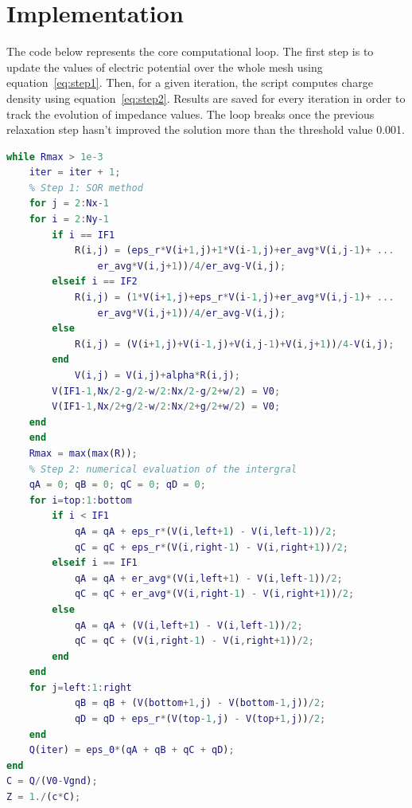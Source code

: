 \documentclass[11pt,a4paper]{article}
\begin{document}
\newpage\section{Implementation}
The code below represents the core computational loop. The first step is to update the values of electric potential over the whole mesh using equation~\ref{eq:step1}. Then, for a given iteration, the script computes charge density using equation~\ref{eq:step2}. Results are saved for every iteration in order to track the evolution of impedance values. The loop breaks once the previous relaxation step hasn't improved the solution more than the threshold value 0.001.
\begin{lstlisting}[language=Matlab]
while Rmax > 1e-3
    iter = iter + 1;
    % Step 1: SOR method
    for j = 2:Nx-1
    for i = 2:Ny-1
        if i == IF1
            R(i,j) = (eps_r*V(i+1,j)+1*V(i-1,j)+er_avg*V(i,j-1)+ ...
                er_avg*V(i,j+1))/4/er_avg-V(i,j); 
        elseif i == IF2
            R(i,j) = (1*V(i+1,j)+eps_r*V(i-1,j)+er_avg*V(i,j-1)+ ...
                er_avg*V(i,j+1))/4/er_avg-V(i,j); 
        else
            R(i,j) = (V(i+1,j)+V(i-1,j)+V(i,j-1)+V(i,j+1))/4-V(i,j);
        end
            V(i,j) = V(i,j)+alpha*R(i,j);
        V(IF1-1,Nx/2-g/2-w/2:Nx/2-g/2+w/2) = V0;
        V(IF1-1,Nx/2+g/2-w/2:Nx/2+g/2+w/2) = V0;
    end
    end
    Rmax = max(max(R));
    % Step 2: numerical evaluation of the intergral
    qA = 0; qB = 0; qC = 0; qD = 0;
    for i=top:1:bottom
        if i < IF1
            qA = qA + eps_r*(V(i,left+1) - V(i,left-1))/2;
            qC = qC + eps_r*(V(i,right-1) - V(i,right+1))/2;
        elseif i == IF1
            qA = qA + er_avg*(V(i,left+1) - V(i,left-1))/2;
            qC = qC + er_avg*(V(i,right-1) - V(i,right+1))/2;
        else
            qA = qA + (V(i,left+1) - V(i,left-1))/2;
            qC = qC + (V(i,right-1) - V(i,right+1))/2;
        end
    end
    for j=left:1:right
            qB = qB + (V(bottom+1,j) - V(bottom-1,j))/2;
            qD = qD + eps_r*(V(top-1,j) - V(top+1,j))/2;
    end
    Q(iter) = eps_0*(qA + qB + qC + qD);
end
C = Q/(V0-Vgnd);
Z = 1./(c*C);
\end{lstlisting}
\end{document}
